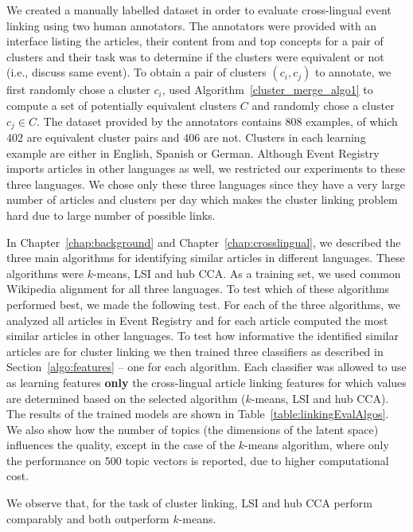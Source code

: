 We created a manually labelled dataset in order to evaluate cross-lingual event
linking using two human annotators. The annotators were provided with an interface
listing the articles, their content from and top concepts for a pair of clusters and
their task was to determine if the clusters were equivalent or not (i.e., discuss same event).
To obtain a pair of clusters $(c_i, c_j)$ to annotate, we first randomly chose a
cluster $c_i$, used Algorithm~\ref{cluster_merge_algo1} to compute a set of potentially
equivalent clusters $C$ and randomly chose a cluster $c_j \in C$. The dataset provided
by the annotators contains 808 examples, of which 402 are equivalent cluster pairs and
406 are not. Clusters in each learning example are either in English, Spanish or German.
Although Event Registry imports articles in other languages as well, we restricted our
experiments to these three languages. We chose only these three languages since they
have a very large number of articles and clusters per day which makes the cluster linking
problem hard due to large number of possible links.

In Chapter~\ref{chap:background} and Chapter~\ref{chap:crosslingual}, we described the
three main algorithms for identifying similar articles in different languages.
These algorithms were $k$-means, LSI and hub CCA. As a training set, we used common
Wikipedia alignment for all three languages. To test
which of these algorithms performed best, we made the following test. For each of the three
algorithms, we analyzed all articles in Event Registry and for each article computed the
most similar articles in other languages. To test how informative the identified similar
articles are for cluster linking we then trained three classifiers as described in
Section~\ref{algo:features} -- one for each algorithm. Each classifier was allowed
to use as learning features \textbf{only} the cross-lingual article linking features
for which values are determined based on the selected algorithm ($k$-means, LSI and hub CCA).
The results of the trained models are shown in Table~\ref{table:linkingEvalAlgos}. We also show
how the number of topics (the dimensions of the latent space) influences the quality,
except in the case of the $k$-means algorithm, where only the performance on 500 topic
vectors is reported, due to higher computational cost.

We observe that, for the task of cluster linking, LSI and hub CCA perform comparably and both outperform $k$-means.


